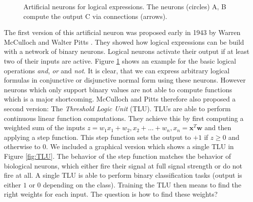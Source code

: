 \begin{figure}[ht]
\begin{center}
{\begin{tabular}{cccc}
  \end{tabular}
  }%
  \end{center}
  \caption[Artificial Neurons for Logical Expressions]{Artificial neurons for logical expressions. The neurons (circles) A, B compute the output C via connections (arrows).}
  \label{fig:ArtificialNeuron}
\end{figure}

The first version of this artificial neuron was proposed early in 1943 by Warren McCulloch and Walter Pitts \cite{mcculloch1943logical}. They showed how logical expressions can be build with a network of binary neurons. Logical neurons activate their output if at least two of their inputs are active. Figure \ref{fig:ArtificialNeuron} shows an example for the basic logical operations \textit{and}, \textit{or} and \textit{not}. It is clear, that we can express arbitrary logical formulas in conjunctive or disjunctive normal form using these neurons. However neurons which only support binary values are not able to compute functions which is a major shortcoming. McCulloch and Pitts therefore also proposed a second version: The \textit{Threshold Logic Unit} (TLU). TLUs are able to perform continuous linear function computations. They achieve this by first computing a weighted sum of the inputs $z = w_1x_1 + w_2, x_2 + \dots + w_n, x_n = \mathbf{x}^T\mathbf{w}$ and then applying a step function. This step function sets the output to $+1$ if $z\geq0$ and otherwise to $0$. We included a graphical version which shows a single TLU in Figure \ref{fig:TLU}. The behavior of the step function matches the behavior of biological neurons, which either fire their signal at full signal strength or do not fire at all. A single TLU is able to perform binary classification tasks (output is either $1$ or $0$ depending on the class). Training the TLU then means to find the right weights for each input. The question is how to find these weights?

